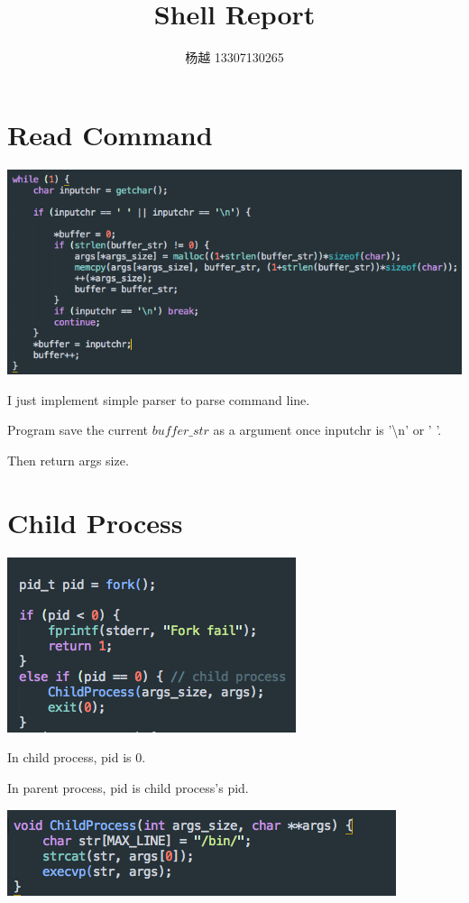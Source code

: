 \documentclass{article}
\title{Shell Report}
\author{杨越 13307130265}
\begin{document}
\maketitle

\section{Read Command}

\includegraphics[scale=0.5]{pics/1.png} 

I just implement simple parser to parse command line.

Program save the current $buffer\_str$ as a argument once inputchr is '\textbackslash n' or '  '.

Then return args size.

\section{Child Process}
\includegraphics[scale=0.5]{pics/2.png} 

In child process, pid is 0.

In parent process, pid is child process's pid.

\includegraphics[scale=0.5]{pics/3.png}
\end{document}
